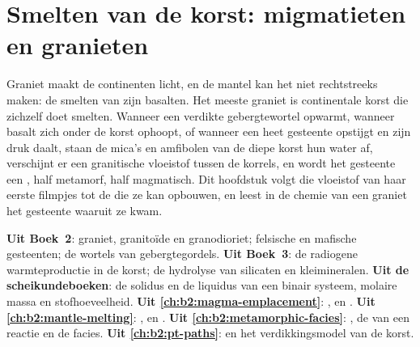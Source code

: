 \chapter{Smelten van de korst: migmatieten en granieten}\label{ch:b2:crustal-melting}

Graniet maakt de continenten licht, en de mantel kan het niet rechtstreeks maken: de
smelten van  zijn basalten. Het meeste graniet is continentale korst die zichzelf doet smelten.
Wanneer een verdikte gebergtewortel opwarmt, wanneer basalt zich onder de korst ophoopt, of wanneer een heet
gesteente opstijgt en zijn druk daalt, staan de mica's en amfibolen van de diepe korst hun
water af, verschijnt er een granitische vloeistof tussen de korrels, en wordt het gesteente een
, half metamorf, half magmatisch. Dit hoofdstuk volgt die vloeistof van haar eerste
filmpjes tot de  die ze kan opbouwen, en leest in de chemie van een graniet het gesteente waaruit ze
kwam.

\begin{recall}
\textbf{Uit Boek~2}: graniet, granitoïde en granodioriet; felsische en mafische
gesteenten; de wortels van gebergtegordels. \textbf{Uit Boek~3}: de radiogene
warmteproductie in de korst; de hydrolyse van silicaten en kleimineralen. \textbf{Uit de scheikundeboeken}: de solidus en de liquidus
van een binair systeem, molaire massa en stofhoeveelheid. \textbf{Uit
\cref{ch:b2:magma-emplacement}}: ,  en . \textbf{Uit
\cref{ch:b2:mantle-melting}}: ,  en
. \textbf{Uit \cref{ch:b2:metamorphic-facies}}: , de  van
een reactie en de facies. \textbf{Uit \cref{ch:b2:pt-paths}}:  en het
verdikkingsmodel van de korst.
\end{recall}

